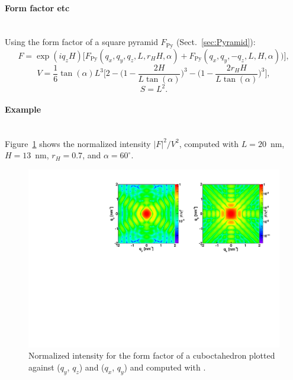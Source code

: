\paragraph{Form factor etc}\strut\\
Using the form factor of a square pyramid $F_\text{Py}$
(Sect.~\ref{sec:Pyramid}):
\begin{equation*}
F=\exp(iq_zH)\Big[F_\text{Py}(q_x,q_y, q_z, L, r_H H,\alpha)
                 +F_\text{Py}(q_x, q_y, -q_z, L, H, \alpha))\Big],
\end{equation*}
\begin{equation*}
  V= \dfrac{1}{6} \tan(\alpha)L^3 \Big[ 2
         - \Big(1 - \dfrac{2H }{L\tan(\alpha)} \Big)^3
           - \Big(1 - \dfrac{2 r_H
             H}{L\tan(\alpha) }\Big)^3\Big],
\end{equation*}
\begin{equation*}
  S =L^2.
\end{equation*}

\paragraph{Example}\strut\\
Figure~\ref{fig:FFcuboctahEx} shows the normalized intensity $|F|^2/V^2$, computed with $L=20$~nm, $H=13$~nm, $r_H=0.7$, and $\alpha=60^{\circ}$.
\begin{figure}[H]
\begin{center}
\includegraphics[angle=-90,width=\textwidth]{fig/ff/figffcuboctah.pdf}
\end{center}
\caption{Normalized intensity for the form factor of a cuboctahedron plotted against ($q_y$, $q_z$) and  ($q_x$, $q_y$) and computed with .}
\label{fig:FFcuboctahEx}
\end{figure}

